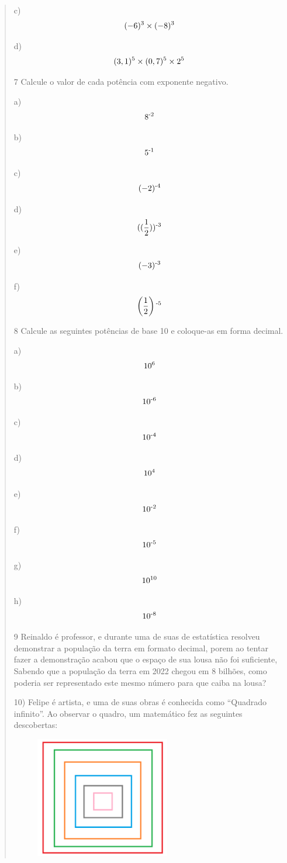 \begin{quote}
c) $$(-6)\textsuperscript{3}\times(-8)\textsuperscript{3}$$ 

d) $$(3,1)\textsuperscript{5}\times(0,7)\textsuperscript{5}\times2\textsuperscript{5}$$ 

\num{7} Calcule o valor de cada potência com exponente negativo.

a) $$8\textsuperscript{-2}$$ 

b) $$5\textsuperscript{-1}$$ 

c) $$(-2)\textsuperscript{-4}$$ 

d) $$((\frac{1}{2}))\textsuperscript{-3}$$ 

e) $$(-3)\textsuperscript{-3}$$ 

f) $$\left(\frac{1}{2}\right)\textsuperscript{-5}$$ 

\num{8} Calcule as seguintes potências de base 10 e coloque-as em forma
decimal.

a) $$10\textsuperscript{6}$$

b) $$10\textsuperscript{-6}$$

c) $$10\textsuperscript{-4}$$

d) $$10\textsuperscript{4}$$

e) $$10\textsuperscript{-2}$$

f) $$10\textsuperscript{-5}$$

g) $$10\textsuperscript{10}$$

h) $$10\textsuperscript{-8}$$

\num{9} Reinaldo é professor, e durante uma de suas de estatística resolveu
demonstrar a população da terra em formato decimal, porem ao tentar
fazer a demonstração acabou que o espaço de sua lousa não foi
suficiente, Sabendo que a população da terra em 2022 chegou em 8
bilhões, como poderia ser representado este mesmo número para que caiba
na lousa?

\hfill

10) Felipe é artista, e uma de suas obras é conhecida como ``Quadrado
infinito''. Ao observar o quadro, um matemático fez as seguintes descobertas:

\begin{figure}[h]
\includegraphics[width=2.3125in,height=2.07917in]{./imgSAEB_8_MAT/media/image2.png}
\end{figure}


\end{quote}

